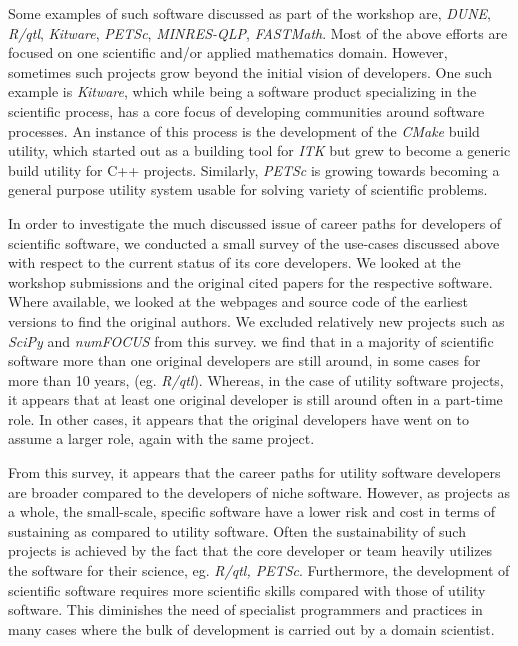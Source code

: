\documentclass[11pt, oneside]{amsart}
\begin{document}

Some examples of such software discussed as part of the workshop are,
\emph{DUNE}, \emph{R/qtl}, \emph{Kitware}, \emph{PETSc}, \emph{MINRES-QLP},
\emph{FASTMath}.  Most of the above efforts are focused on one scientific
and/or applied mathematics domain. However, sometimes such projects grow beyond
the initial vision of developers. One such example is \emph{Kitware}, which
while being a software product specializing in the scientific process, has a
core focus of developing communities around software processes. An instance of
this process is the development of the \emph{CMake} build utility, which
started out as a building tool for \emph{ITK} but grew to become a generic
build utility for C++ projects. Similarly, \emph{PETSc} is growing towards
becoming a general purpose utility system usable for solving variety of
scientific problems.
% 

In order to investigate the much discussed issue of career paths for developers
of scientific software, we conducted a small survey of the use-cases discussed
above with respect to the current status of its core developers. We looked at
the workshop submissions and the original cited papers for the respective
software. Where available, we looked at the webpages and source code of the
earliest versions to find the original authors. We excluded relatively new
projects such as \emph{SciPy} and \emph{numFOCUS} from this survey. we find
that in a majority of scientific software more than one original developers are
still around, in some cases for more than 10 years, (eg. \emph{R/qtl}).
Whereas, in the case of utility software projects, it appears that at least one
original developer is still around often in a part-time role. In other cases,
it appears that the original developers have went on to assume a larger role,
again with the same project.

From this survey, it appears that the career paths for utility software
developers are broader compared to the developers of niche software. However,
as projects as a whole, the small-scale, specific software have a lower risk
and cost in terms of sustaining as compared to utility software. Often the
sustainability of such projects is achieved by the fact that the core
developer or team heavily utilizes the software for their science, eg.
\emph{R/qtl, PETSc}. Furthermore, the development of scientific software requires more
scientific skills compared with those of utility software. This diminishes the
need of specialist programmers and practices in many cases where the bulk of
development is carried out by a domain scientist.
\end{document}
